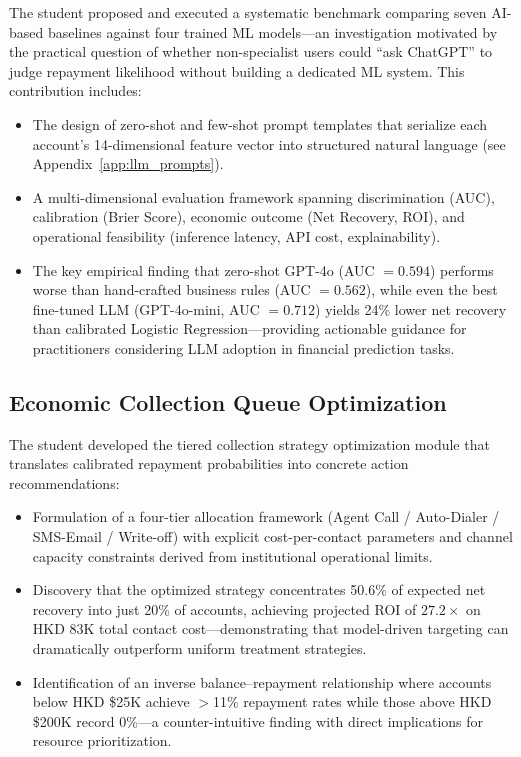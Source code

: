 \documentclass[12pt, a4paper]{article}
\begin{document}
The student proposed and executed a systematic benchmark comparing seven AI-based baselines against four trained ML models---an investigation motivated by the practical question of whether non-specialist users could ``ask ChatGPT'' to judge repayment likelihood without building a dedicated ML system. This contribution includes:
\begin{itemize}[leftmargin=*]
    \item The design of zero-shot and few-shot prompt templates that serialize each account's 14-dimensional feature vector into structured natural language (see Appendix~\ref{app:llm_prompts}).
    
    \item A multi-dimensional evaluation framework spanning discrimination (AUC), calibration (Brier Score), economic outcome (Net Recovery, ROI), and operational feasibility (inference latency, API cost, explainability).
    
    \item The key empirical finding that zero-shot GPT-4o (AUC $= 0.594$) performs worse than hand-crafted business rules (AUC $= 0.562$), while even the best fine-tuned LLM (GPT-4o-mini, AUC $= 0.712$) yields 24\% lower net recovery than calibrated Logistic Regression---providing actionable guidance for practitioners considering LLM adoption in financial prediction tasks.
\end{itemize}

\subsection{Economic Collection Queue Optimization}

The student developed the tiered collection strategy optimization module that translates calibrated repayment probabilities into concrete action recommendations:
\begin{itemize}[leftmargin=*]
    \item Formulation of a four-tier allocation framework (Agent Call / Auto-Dialer / SMS-Email / Write-off) with explicit cost-per-contact parameters and channel capacity constraints derived from institutional operational limits.
    
    \item Discovery that the optimized strategy concentrates 50.6\% of expected net recovery into just 20\% of accounts, achieving projected ROI of $27.2\times$ on HKD 83K total contact cost---demonstrating that model-driven targeting can dramatically outperform uniform treatment strategies.
    
    \item Identification of an inverse balance--repayment relationship where accounts below HKD \$25K achieve $>$11\% repayment rates while those above HKD \$200K record 0\%---a counter-intuitive finding with direct implications for resource prioritization.
\end{itemize}
\end{document}
